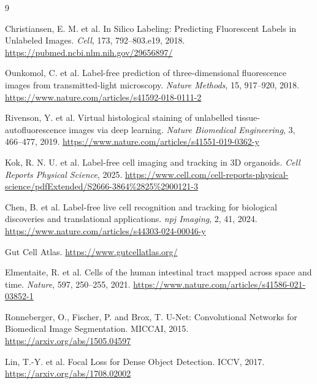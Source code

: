 \documentclass[11pt]{article}
\begin{document}
\begin{thebibliography}{9}

Christiansen, E. M. et al.
\newblock In Silico Labeling: Predicting Fluorescent Labels in Unlabeled Images.
\newblock \emph{Cell}, 173, 792--803.e19, 2018.
\newblock \url{https://pubmed.ncbi.nlm.nih.gov/29656897/}

Ounkomol, C. et al.
\newblock Label-free prediction of three-dimensional fluorescence images from transmitted-light microscopy.
\newblock \emph{Nature Methods}, 15, 917--920, 2018.
\newblock \url{https://www.nature.com/articles/s41592-018-0111-2}

Rivenson, Y. et al.
\newblock Virtual histological staining of unlabelled tissue-autofluorescence images via deep learning.
\newblock \emph{Nature Biomedical Engineering}, 3, 466--477, 2019.
\newblock \url{https://www.nature.com/articles/s41551-019-0362-y}

Kok, R. N. U. et al.
\newblock Label-free cell imaging and tracking in 3D organoids.
\newblock \emph{Cell Reports Physical Science}, 2025.
\newblock \url{https://www.cell.com/cell-reports-physical-science/pdfExtended/S2666-3864%2825%2900121-3}

Chen, B. et al.
\newblock Label-free live cell recognition and tracking for biological discoveries and translational applications.
\newblock \emph{npj Imaging}, 2, 41, 2024.
\newblock \url{https://www.nature.com/articles/s44303-024-00046-y}

Gut Cell Atlas.
\newblock \url{https://www.gutcellatlas.org/}

Elmentaite, R. et al.
\newblock Cells of the human intestinal tract mapped across space and time.
\newblock \emph{Nature}, 597, 250--255, 2021.
\newblock \url{https://www.nature.com/articles/s41586-021-03852-1}

Ronneberger, O., Fischer, P. and Brox, T.
\newblock U-Net: Convolutional Networks for Biomedical Image Segmentation.
\newblock MICCAI, 2015.
\newblock \url{https://arxiv.org/abs/1505.04597}

Lin, T.-Y. et al.
\newblock Focal Loss for Dense Object Detection.
\newblock ICCV, 2017.
\newblock \url{https://arxiv.org/abs/1708.02002}

\end{thebibliography}
\end{document}
